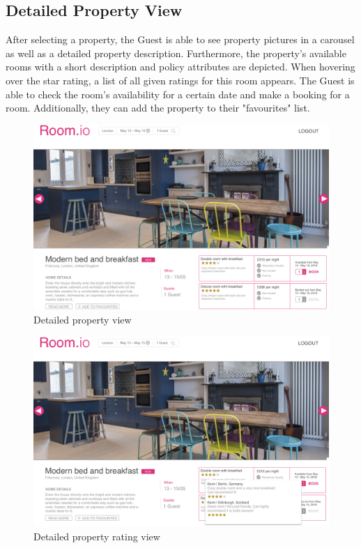 \subsection{Detailed Property View}
After selecting a property, the Guest is able to see property pictures in a carousel as well as a detailed property description. Furthermore, the property's available rooms with a short description and policy attributes are depicted. When hovering over the star rating, a list of all given ratings for this room appears. The Guest is able to check the room's availability for a certain date and make a booking for a room. Additionally, they can add the property to their "favourites" list.

\begin{figure}[H]
  \centering
  \includegraphics[width=17cm]{img/mockups/guest_detailedproperty.png}
  \caption{Detailed property view}
  \label{Property_List_View}
\end{figure}

\begin{figure}[H]
  \centering
  \includegraphics[width=17cm]{img/mockups/guest_detailedpropertyratings.png}
  \caption{Detailed property rating view}
  \label{Detailed_Property_Rating_View}
\end{figure}

